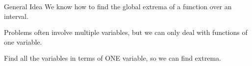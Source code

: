 %
\begin{frame}{General Idea}
We know how to find the global extrema of a function over an interval.\pause\vfill

Problems often involve multiple variables, but we can only deal with functions of one variable.\pause\vfill

Find all the variables in terms of ONE variable, so we can find extrema.
\end{frame}

